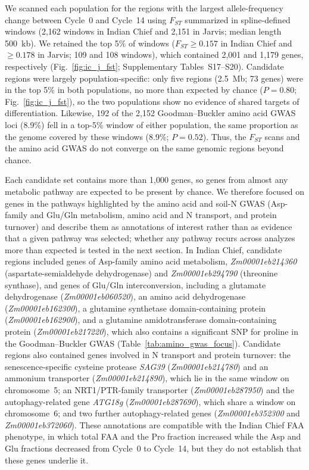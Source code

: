 We scanned each population for the regions with the largest allele-frequency change between Cycle~0 and Cycle~14 using $F_{ST}$ summarized in spline-defined windows (2,162 windows in Indian Chief and 2,151 in Jarvis; median length 500~kb). We retained the top 5\% of windows ($F_{ST} \ge 0.157$ in Indian Chief and $\ge 0.178$ in Jarvis; 109 and 108 windows), which contained 2,001 and 1,179 genes, respectively (Fig.~\ref{fig:ic_j_fst}; Supplementary Tables~S17--S20). Candidate regions were largely population-specific: only five regions (2.5~Mb; 73 genes) were in the top 5\% in both populations, no more than expected by chance ($P = 0.80$; Fig.~\ref{fig:ic_j_fst}), so the two populations show no evidence of shared targets of differentiation. Likewise, 192 of the 2,152 Goodman--Buckler amino acid GWAS loci (8.9\%) fell in a top-5\% window of either population, the same proportion as the genome covered by these windows (8.9\%; $P = 0.52$). Thus, the $F_{ST}$ scans and the amino acid GWAS do not converge on the same genomic regions beyond chance.

Each candidate set contains more than 1,000 genes, so genes from almost any metabolic pathway are expected to be present by chance. We therefore focused on genes in the pathways highlighted by the amino acid and soil-N GWAS (Asp-family and Glu/Gln metabolism, amino acid and N transport, and protein turnover) and describe them as annotations of interest rather than as evidence that a given pathway was selected; whether any pathway recurs across analyzes more than expected is tested in the next section. In Indian Chief, candidate regions included genes of Asp-family amino acid metabolism, \textit{Zm00001eb214360} (aspartate-semialdehyde dehydrogenase) and \textit{Zm00001eb294790} (threonine synthase), and genes of Glu/Gln interconversion, including a glutamate dehydrogenase (\textit{Zm00001eb060520}), an amino acid dehydrogenase (\textit{Zm00001eb162300}), a glutamine synthetase domain-containing protein (\textit{Zm00001eb162900}), and a glutamine amidotransferase domain-containing protein (\textit{Zm00001eb217220}), which also contains a significant SNP for proline in the Goodman--Buckler GWAS (Table~\ref{tab:amino_gwas_focus}). Candidate regions also contained genes involved in N transport and protein turnover: the senescence-specific cysteine protease \textit{SAG39} (\textit{Zm00001eb214780}) and an ammonium transporter (\textit{Zm00001eb214890}), which lie in the same window on chromosome~5; an NRT1/PTR-family transporter (\textit{Zm00001eb287950}) and the autophagy-related gene \textit{ATG18g} (\textit{Zm00001eb287690}), which share a window on chromosome~6; and two further autophagy-related genes (\textit{Zm00001eb352300} and \textit{Zm00001eb372060}). These annotations are compatible with the Indian Chief FAA phenotype, in which total FAA and the Pro fraction increased while the Asp and Glu fractions decreased from Cycle~0 to Cycle~14, but they do not establish that these genes underlie it.

